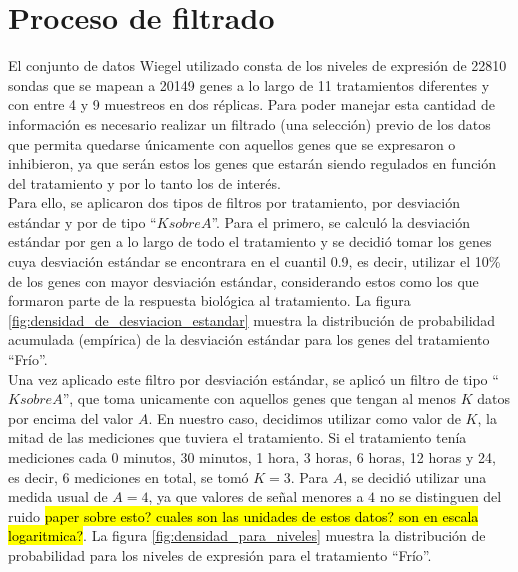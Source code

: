 \section{Proceso de filtrado}
El conjunto de datos Wiegel utilizado consta de los niveles de expresión de 22810 sondas que se mapean a 20149 genes a lo largo de 11 tratamientos diferentes y con entre 4 y 9 muestreos en dos réplicas. Para poder manejar esta cantidad de información es necesario realizar un filtrado (una selección) previo de los datos que permita quedarse únicamente con aquellos genes que se expresaron o inhibieron, ya que serán estos los genes que estarán siendo regulados en función del tratamiento y por lo tanto los de interés.\\
Para ello, se aplicaron dos tipos de filtros por tratamiento, por desviación estándar y por de tipo ``$K sobre A$''. Para el primero, se calculó la desviación estándar por gen a lo largo de todo el tratamiento y se decidió tomar los genes cuya desviación estándar se encontrara en el cuantil 0.9, es decir, utilizar el 10\% de los genes con mayor desviación estándar, considerando estos como los que formaron parte de la respuesta biológica al tratamiento. La figura \ref{fig:densidad_de_desviacion_estandar} muestra la distribución de probabilidad acumulada (empírica) de la desviación estándar para los genes del tratamiento ``Frío''.\\
Una vez aplicado este filtro por desviación estándar, se aplicó un filtro de tipo ``$K sobre A$'', que toma unicamente con aquellos genes que tengan al menos $K$ datos por encima del valor $A$. En nuestro caso, decidimos utilizar como valor de $K$, la mitad de las mediciones que tuviera el tratamiento. Si el tratamiento tenía mediciones cada 0 minutos, 30 minutos, 1 hora, 3 horas, 6 horas, 12 horas y 24, es decir, 6 mediciones en total, se tomó $K = 3$. Para $A$, se decidió utilizar una medida usual de $A=4$, ya que valores de señal menores a $4$ no se distinguen del ruido \hl{paper sobre esto? cuales son las unidades de estos datos? son en escala logaritmica?}. La figura \ref{fig:densidad_para_niveles} muestra la distribución de probabilidad para los niveles de expresión para el tratamiento ``Frío''.
